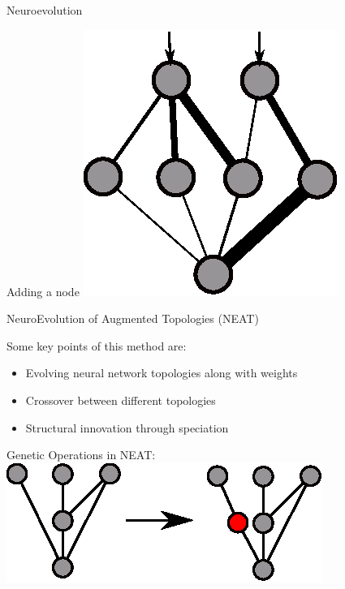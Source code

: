 \documentclass[6pt]{beamer}
\begin{document}
\begin{frame}{Neuroevolution}
\begin{block}{Adding a node}
\centering
\includegraphics[height=0.7\textheight]{../Figures/Misc/networksMutationWeights4.eps}
\end{block}
\end{frame}

\begin{frame}{NeuroEvolution of Augmented Topologies (NEAT)~}
\begin{block}{Some key points of this method are:}
\begin{itemize}
\item Evolving neural network topologies along with weights
\item Crossover between different topologies
\item Structural innovation through speciation
\end{itemize}
\end{block}
\pause
\begin{block}{Genetic Operations in NEAT:}
\centering
\includegraphics[height=0.25\textheight]{../Figures/Misc/neatAddNode.eps}
\end{block}
\end{frame}
\end{document}
